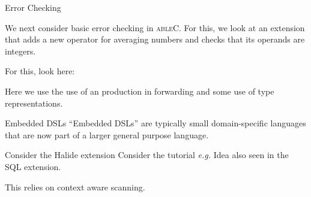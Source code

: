\documentclass[notes,11pt,aspectratio=169]{beamer}
\newcommand{\ableC}{\textsc{ableC}}
\begin{document}
\begin{frame}{Error Checking}

We next consider basic error checking in \ableC{}.  For this, we look
at an extension that adds a new operator for averaging numbers and
checks that its operands are integers.  

\bigskip
For this, look here:

\bigskip
{}

\bigskip
Here we use the use of an  production in forwarding and
some use of type representations.


\end{frame}

\begin{frame}{Embedded DSLs}
``Embedded DSLs'' are typically small domain-specific languages that
  are now part of a larger general purpose language.

\bi
 \x Consider the Halide extension
 \x Consider the tutorial 
 \bi
  \x \emph{e.g.}  
 \ei
 \x Idea also seen in the SQL extension.
\ei

\bigskip
This relies on context aware scanning.
\end{frame}
\end{document}
